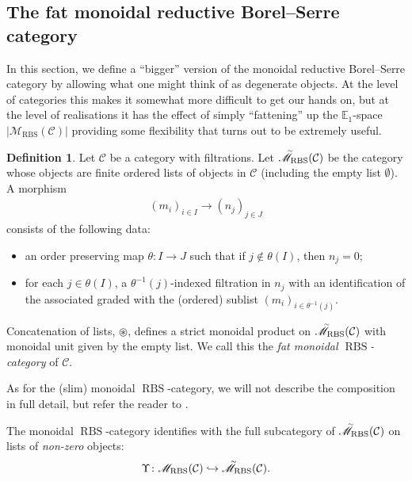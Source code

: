 \documentclass[12pt, reqno]{amsart}
\theoremstyle{plain}
\theoremstyle{definition}
\newtheorem{definition}[theorem]{Definition}
\begin{document}
\subsection{The fat monoidal reductive Borel--Serre category}

In this section, we define a ``bigger'' version of the monoidal reductive Borel--Serre category by allowing what one might think of as degenerate objects. At the level of categories this makes it somewhat more difficult to get our hands on, but at the level of realisations it has the effect of simply ``fattening'' up the $\mathbb{E}_1$-space $|\mathscr{M}_{\operatorname{RBS}}(\mathcal{C})|$ providing some flexibility that turns out to be extremely useful.


\begin{definition}\label{monoidal category of filtrations and associated gradeds}
Let $\mathcal{C}$ be a category with filtrations. Let $\accentset{\sim}{\mathscr{M}}_{\operatorname{RBS}}(\mathcal{C})$ be the category whose objects are finite ordered lists of objects in $\mathcal{C}$ (including the empty list $\emptyset$). A morphism
\begin{align*}
(m_i)_{i\in I}\rightarrow (n_j)_{j\in J}
\end{align*}
consists of the following data:
\begin{itemize}
\item an order preserving map $\theta\colon I\rightarrow J$ such that if $j\notin \theta(I)$, then $n_j=0$;
\item for each $j\in \theta(I)$, a $\theta^{-1}(j)$-indexed filtration in $n_j$ with an identification of the associated graded with the (ordered) sublist $(m_i)_{i\in \theta^{-1}(j)}$.
\end{itemize}
Concatenation of lists, $\circledast$, defines a strict monoidal product on $\accentset{\sim}{\mathscr{M}}_{\operatorname{RBS}}(\mathcal{C})$ with monoidal unit given by the empty list. We call this the \textit{fat monoidal $\operatorname{RBS}$-category} of $\mathcal{C}$.
\end{definition}

As for the (slim) monoidal $\operatorname{RBS}$-category, we will not describe the composition in full detail, but refer the reader to \cite[Construction 7.14 and Definition 7.7]{ClausenOrsnesJansen}.

The monoidal $\operatorname{RBS}$-category identifies with the full subcategory of $\accentset{\sim}{\mathscr{M}}_{\operatorname{RBS}}(\mathcal{C})$ on lists of \textit{non-zero} objects:
\begin{align*}
\Upsilon \colon \mathscr{M}_{\operatorname{RBS}}(\mathcal{C}) \hookrightarrow \accentset{\sim}{\mathscr{M}}_{\operatorname{RBS}}(\mathcal{C}).
\end{align*}
\end{document}
